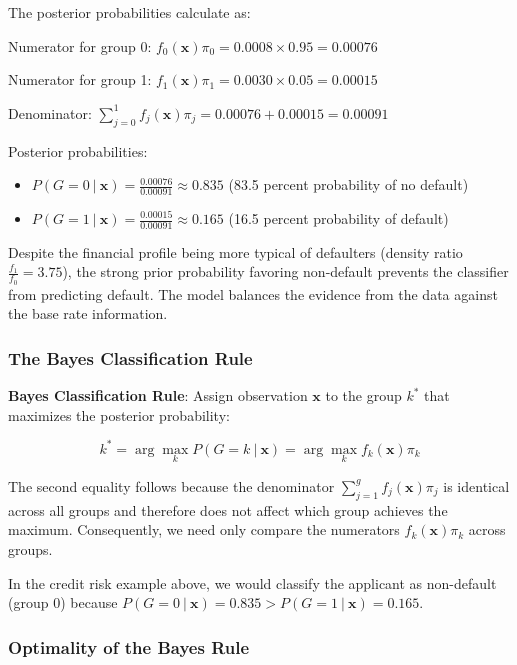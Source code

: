 \documentclass[
]{article}
\begin{document}
The posterior probabilities calculate as:

Numerator for group 0:
\(f_{0}\left( \mathbf{x} \right)\pi_{0} = 0.0008 \times 0.95 = 0.00076\)

Numerator for group 1:
\(f_{1}\left( \mathbf{x} \right)\pi_{1} = 0.0030 \times 0.05 = 0.00015\)

Denominator:
\(\sum_{j = 0}^{1}f_{j}\left( \mathbf{x} \right)\pi_{j} = 0.00076 + 0.00015 = 0.00091\)

Posterior probabilities:

\begin{itemize}
\item
  \(P\left( G = 0~|~\mathbf{x} \right) = \frac{0.00076}{0.00091} \approx 0.835\)
  (83.5 percent probability of no default)
\item
  \(P\left( G = 1~|~\mathbf{x} \right) = \frac{0.00015}{0.00091} \approx 0.165\)
  (16.5 percent probability of default)
\end{itemize}

Despite the financial profile being more typical of defaulters (density
ratio \(\frac{f_{1}}{f_{0}} = 3.75\)), the strong prior probability
favoring non-default prevents the classifier from predicting default.
The model balances the evidence from the data against the base rate
information.

\subsubsection{The Bayes Classification Rule}

\textbf{Bayes Classification Rule}: Assign observation \(\mathbf{x}\) to
the group \(k^{\ast}\) that maximizes the posterior probability:

\[k^{\ast} = \arg\max\limits_{k}P\left( G = k~|~\mathbf{x} \right) = \arg\max\limits_{k}f_{k}\left( \mathbf{x} \right)\pi_{k}\]

The second equality follows because the denominator
\(\sum_{j = 1}^{g}f_{j}\left( \mathbf{x} \right)\pi_{j}\) is identical
across all groups and therefore does not affect which group achieves the
maximum. Consequently, we need only compare the numerators
\(f_{k}\left( \mathbf{x} \right)\pi_{k}\) across groups.

In the credit risk example above, we would classify the applicant as
non-default (group 0) because
\(P\left( G = 0~|~\mathbf{x} \right) = 0.835 > P\left( G = 1~|~\mathbf{x} \right) = 0.165\).

\subsubsection{Optimality of the Bayes Rule}
\end{document}

